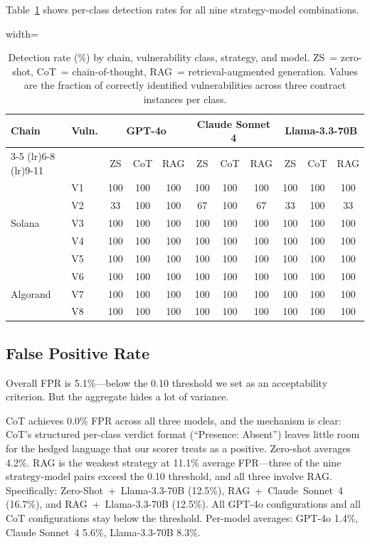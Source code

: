 \documentclass[journal]{IEEEtran}
\begin{document}
Table~\ref{tab:main_results} shows per-class detection rates for all nine
strategy-model combinations.
\begin{table}[!t]
\centering
\caption{Detection rate (\%) by chain, vulnerability class, strategy, and model.
ZS~= zero-shot, CoT~= chain-of-thought, RAG~= retrieval-augmented generation.
Values are the fraction of correctly identified vulnerabilities across three
contract instances per class.}
\label{tab:main_results}
\begin{adjustbox}{width=\columnwidth}
\begin{tabular}{llccccccccc}
\toprule
\multirow{2}{*}{\textbf{Chain}} & \multirow{2}{*}{\textbf{Vuln.}} &
\multicolumn{3}{c}{\textbf{GPT-4o}} &
\multicolumn{3}{c}{\textbf{Claude Sonnet 4}} &
\multicolumn{3}{c}{\textbf{Llama-3.3-70B}} \\
\cmidrule(lr){3-5} \cmidrule(lr){6-8} \cmidrule(lr){9-11}
& & ZS & CoT & RAG & ZS & CoT & RAG & ZS & CoT & RAG \\
\midrule
\multirow{5}{*}{Solana}
  & V1 & 100 & 100 & 100 & 100 & 100 & 100 & 100 & 100 & 100 \\
  & V2 &  33 & 100 & 100 &  67 & 100 &  67 &  33 & 100 &  33 \\
  & V3 & 100 & 100 & 100 & 100 & 100 & 100 & 100 & 100 & 100 \\
  & V4 & 100 & 100 & 100 & 100 & 100 & 100 & 100 & 100 & 100 \\
  & V5 & 100 & 100 & 100 & 100 & 100 & 100 & 100 & 100 & 100 \\
\midrule
\multirow{3}{*}{Algorand}
  & V6 & 100 & 100 & 100 & 100 & 100 & 100 & 100 & 100 & 100 \\
  & V7 & 100 & 100 & 100 & 100 & 100 & 100 & 100 & 100 & 100 \\
  & V8 & 100 & 100 & 100 & 100 & 100 & 100 & 100 & 100 & 100 \\
\bottomrule
\end{tabular}
\end{adjustbox}
\end{table}

\subsection{False Positive Rate}

Overall FPR is 5.1\%---below the 0.10 threshold we set as an acceptability
criterion.
But the aggregate hides a lot of variance.

CoT achieves 0.0\% FPR across all three models, and the mechanism is
clear: CoT's structured per-class verdict format (``Presence: Absent'') leaves
little room for the hedged language that our scorer treats as a positive.
Zero-shot averages 4.2\%.
RAG is the weakest strategy at 11.1\% average FPR---three of the nine
strategy-model pairs exceed the 0.10 threshold, and all three involve RAG.
Specifically: Zero-Shot~+~Llama-3.3-70B (12.5\%), RAG~+~Claude~Sonnet~4
(16.7\%), and RAG~+~Llama-3.3-70B (12.5\%).
All GPT-4o configurations and all CoT configurations stay below the threshold.
Per-model averages: GPT-4o 1.4\%, Claude Sonnet~4 5.6\%, Llama-3.3-70B 8.3\%.
\end{document}
